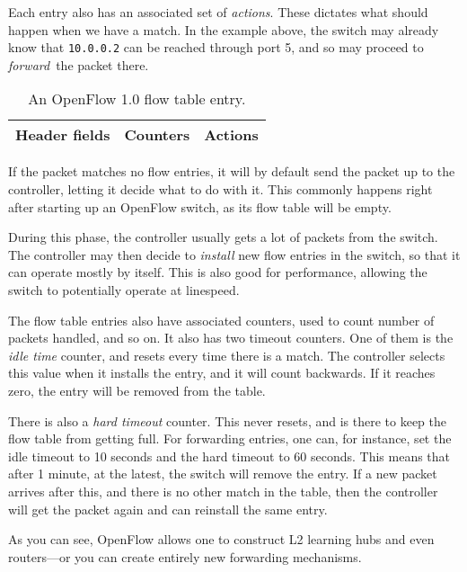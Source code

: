 Each entry also has an associated set of \textit{actions}.  These dictates
what should happen when we have a match.  In the example above, the switch
may already know that \texttt{10.0.0.2} can be reached through port 5, and
so may proceed to \textit{forward} the packet there.

\begin{table}[H]
  \centering
  \begin{tabular}{|l|l|l|}
    \hline \textbf{Header fields} &
           \textbf{Counters} &
           \textbf{Actions} \\
    \hline
  \end{tabular}

  \caption{An OpenFlow 1.0 flow table entry.}
  \label{openflow.flow.entry.spec}
\end{table}

If the packet matches no flow entries, it will by default send the packet up
to the controller, letting it decide what to do with it.  This commonly
happens right after starting up an OpenFlow switch, as its flow table will
be empty.

During this phase, the controller usually gets a lot of packets from the
switch.  The controller may then decide to \textit{install} new flow entries
in the switch, so that it can operate mostly by itself.  This is also good
for performance, allowing the switch to potentially operate at linespeed.

The flow table entries also have associated counters, used to count number
of packets handled, and so on.  It also has two timeout counters.  One of
them is the \textit{idle time} counter, and resets every time there is a
match.  The controller selects this value when it installs the entry, and it
will count backwards.  If it reaches zero, the entry will be removed from
the table.

There is also a \textit{hard timeout} counter.  This never resets, and is
there to keep the flow table from getting full.  For forwarding entries, one
can, for instance, set the idle timeout to 10 seconds and the hard timeout
to 60 seconds.  This means that after 1 minute, at the latest, the switch
will remove the entry.  If a new packet arrives after this, and there is no
other match in the table, then the controller will get the packet again and
can reinstall the same entry.

As you can see, OpenFlow allows one to construct L2 learning hubs and even
routers---or you can create entirely new forwarding mechanisms.


